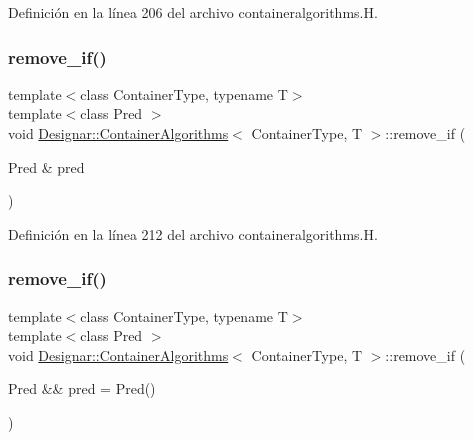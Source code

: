 Definición en la línea 206 del archivo containeralgorithms.\+H.

\mbox{\label{class_designar_1_1_container_algorithms_a9f62149769fa7797947d019692306e09}} 
\subsubsection{\texorpdfstring{remove\+\_\+if()}{remove\_if()}\hspace{0.1cm}{\footnotesize\ttfamily [1/2]}}
{\footnotesize\ttfamily template$<$class Container\+Type, typename T$>$ \\
template$<$class Pred $>$ \\
void \hyperlink{class_designar_1_1_container_algorithms}{Designar\+::\+Container\+Algorithms}$<$ Container\+Type, T $>$\+::remove\+\_\+if (\begin{DoxyParamCaption}\item[{Pred \&}]{pred }\end{DoxyParamCaption})\hspace{0.3cm}{\ttfamily [inline]}}



Definición en la línea 212 del archivo containeralgorithms.\+H.

\mbox{\label{class_designar_1_1_container_algorithms_ae619268160dffda758b816a0db9bd8a0}} 
\subsubsection{\texorpdfstring{remove\+\_\+if()}{remove\_if()}\hspace{0.1cm}{\footnotesize\ttfamily [2/2]}}
{\footnotesize\ttfamily template$<$class Container\+Type, typename T$>$ \\
template$<$class Pred $>$ \\
void \hyperlink{class_designar_1_1_container_algorithms}{Designar\+::\+Container\+Algorithms}$<$ Container\+Type, T $>$\+::remove\+\_\+if (\begin{DoxyParamCaption}\item[{Pred \&\&}]{pred = {\ttfamily Pred()} }\end{DoxyParamCaption})\hspace{0.3cm}{\ttfamily [inline]}}



